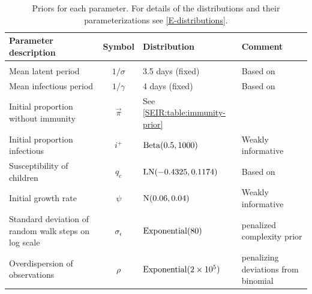 \documentclass[thesis.tex]{subfiles}
\begin{document}
\begin{landscape}
\begin{table}
\begin{tabular}{l c l l}
    Parameter description & Symbol & Distribution & Comment \\
    \hline \\
    Mean latent period & $1/\sigma$ & 3.5 days (fixed) & Based on \textcite{zhaoEstimating} \\
    Mean infectious period & $1/\gamma$ & 4 days (fixed) & Based on \textcite{zhaoEstimating} \\
    Initial proportion without immunity & $\vec\pi$ & See \cref{SEIR:table:immunity-prior} & \\
    Initial proportion infectious & $i^+$ & $\operatorname{Beta}(0.5, 1000)$ & Weakly informative \\
    Susceptibility of children & $q_c$ & $\operatorname{LN}(-0.4325, 0.1174)$ & Based on \textcite{vinerTransmission}  \\
    Initial growth rate & $\psi$ & $\operatorname{N}(0.06, 0.04)$ & Weakly informative \\
    Standard deviation of random walk steps on log scale & $\sigma_\epsilon$ & $\operatorname{Exponential}(80)$ & penalized complexity prior \\
    Overdispersion of observations & $\rho$ & $\operatorname{Exponential}(2 \times 10^5)$ & penalizing deviations from binomial
\end{tabular}
\caption[SEIR model priors]{Priors for each parameter. For details of the distributions and their parameterizations see \cref{E-distributions}.}
\label{SEIR:table:priors}
\end{table}
\begin{table}


\end{table}
\end{landscape}
\end{document}
